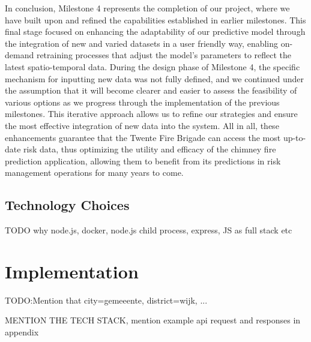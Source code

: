\documentclass{utitcphd_overleaf}
\begin{document}
In conclusion, Milestone 4 represents the completion of our project, where we have built upon and refined the capabilities established in earlier milestones. This final stage focused on enhancing the adaptability of our predictive model through the integration of new and varied datasets in a user friendly way, enabling on-demand retraining processes that adjust the model’s parameters to reflect the latest spatio-temporal data. During the design phase of Milestone 4, the specific mechanism for inputting new data was not fully defined, and we continued under the assumption that it will become clearer and easier to assess the feasibility of various options as we progress through the implementation of the previous milestones. This iterative approach allows us to refine our strategies and ensure the most effective integration of new data into the system. All in all, these enhancements guarantee that the Twente Fire Brigade can access the most up-to-date risk data, thus optimizing the utility and efficacy of the chimney fire prediction application, allowing them to benefit from its predictions in risk management operations for many years to come.

\section{Technology Choices}

TODO why node.js, docker, node.js child process, express, JS as full stack etc

\chapter{Implementation}
\label{chap:implementation}

TODO:Mention that city=gemeeente, district=wijk, ... 

MENTION THE TECH STACK, mention example api request and responses in appendix




\end{document}
